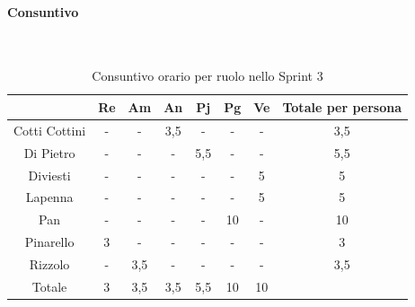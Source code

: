 \documentclass{article}
\begin{document}
                \paragraph{Consuntivo}\mbox{}\\
                \begin{table}[H]
                    \centering
                    \begin{tabular}{|c|c|c|c|c|c|c|c|}
                    \hline
                                  & Re  & Am  & An  & Pj  & Pg  & Ve  & Totale per persona \\ \hline
                    Cotti Cottini & -   & -   & 3,5 & -   & -   & -   & 3,5                \\ \hline
                    Di Pietro     & -   & -   & -   & 5,5 & -   & -   & 5,5                \\ \hline
                    Diviesti      & -   & -   & -   & -   & -   & 5   & 5                  \\ \hline
                    Lapenna       & -   & -   & -   & -   & -   & 5   & 5                  \\ \hline
                    Pan           & -   & -   & -   & -   & 10  & -   & 10                 \\ \hline
                    Pinarello     & 3   & -   & -   & -   & -   & -   & 3                  \\ \hline
                    Rizzolo       & -   & 3,5 & -   & -   & -   & -   & 3,5                \\ \hline
                    Totale        & 3   & 3,5 & 3,5 & 5,5 & 10  & 10  &                    \\ \hline
                    \end{tabular}
                    \caption{Consuntivo orario per ruolo nello Sprint 3}
                \end{table}

\end{document}
